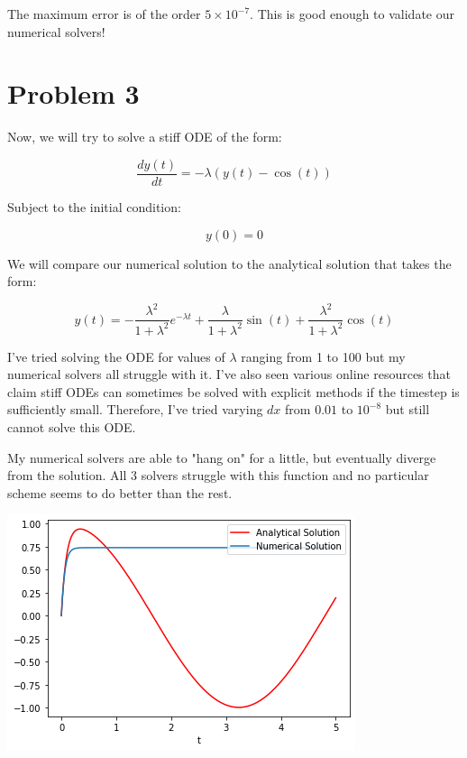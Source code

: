 \documentclass[12pt, letterpaper]{article}
\begin{document}
The maximum error is of the order $5 \times 10^{-7}$. This is good enough to validate our numerical solvers!

\section*{Problem 3}

Now, we will try to solve a stiff ODE of the form: 

\begin{equation}
\frac{dy(t)}{dt} = -\lambda (y(t) - \cos(t))
\end{equation}

Subject to the initial condition: 

\begin{equation}
y(0) = 0
\end{equation}

We will compare our numerical solution to the analytical solution that takes the form:

\begin{equation}
y(t) = -\frac{\lambda^2}{1 + \lambda^2} e^{-\lambda t} + \frac{\lambda}{1 + \lambda^2} \sin(t) + \frac{\lambda^2}{1 + \lambda^2} \cos(t)
\end{equation}

I've tried solving the ODE for values of $\lambda$ ranging from 1 to 100 but my numerical solvers all struggle with it. I've also seen various online resources that claim stiff ODEs can sometimes be solved with explicit methods if the timestep is sufficiently small. Therefore, I've tried varying $dx$ from $0.01$ to $10^{-8}$ but still cannot solve this ODE. 

My numerical solvers are able to "hang on" for a little, but eventually diverge from the solution. All 3 solvers struggle with this function and no particular scheme seems to do better than the rest.

\includegraphics{stiff_EQ_Failure.png}
\end{document}
